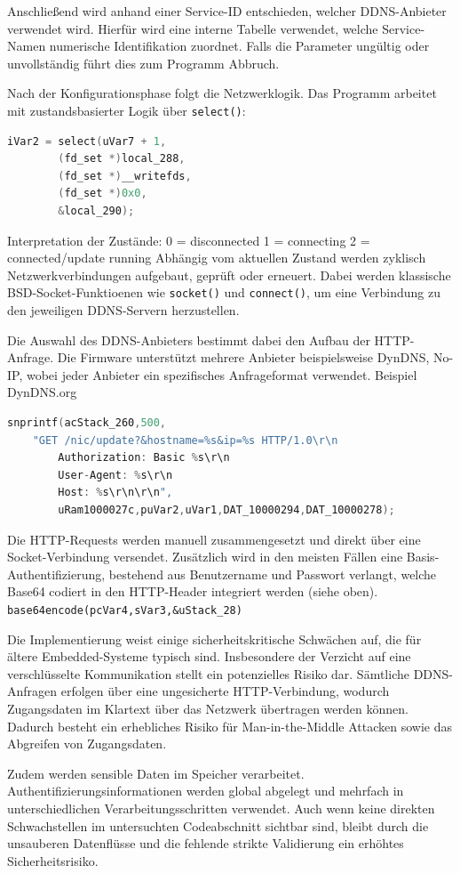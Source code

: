 	Anschließend wird anhand einer Service-ID entschieden, welcher DDNS-Anbieter
	verwendet wird. Hierfür wird eine interne Tabelle verwendet, welche Service-Namen numerische Identifikation zuordnet.
	Falls die Parameter ungültig oder unvollständig führt dies zum Programm Abbruch.

	Nach der Konfigurationsphase folgt die Netzwerklogik.
	Das Programm arbeitet mit zustandsbasierter Logik über \texttt{select()}:
\begin{lstlisting}[language=c]
iVar2 = select(uVar7 + 1,
		(fd_set *)local_288,
		(fd_set *)__writefds,
		(fd_set *)0x0,
		&local_290);
\end{lstlisting}
	Interpretation der Zustände:
	0 = disconnected
	1 = connecting
	2 = connected/update running
	Abhängig vom aktuellen Zustand werden zyklisch Netzwerkverbindungen aufgebaut, geprüft oder erneuert. 
	Dabei werden klassische BSD-Socket-Funktioenen wie \texttt{socket()} und \texttt{connect()},
	um eine Verbindung zu den jeweiligen DDNS-Servern herzustellen.
	
	Die Auswahl des DDNS-Anbieters bestimmt dabei den Aufbau der HTTP-Anfrage. 
	Die Firmware unterstützt mehrere Anbieter beispielsweise DynDNS, No-IP, wobei jeder Anbieter ein spezifisches Anfrageformat verwendet. 
	Beispiel DynDNS.org
\begin{lstlisting}[language=c]
snprintf(acStack_260,500,
	"GET /nic/update?&hostname=%s&ip=%s HTTP/1.0\r\n
		Authorization: Basic %s\r\n
		User-Agent: %s\r\n
		Host: %s\r\n\r\n",
		uRam1000027c,puVar2,uVar1,DAT_10000294,DAT_10000278);
\end{lstlisting}
	Die HTTP-Requests werden manuell zusammengesetzt und direkt über eine Socket-Verbindung versendet.
	Zusätzlich wird in den meisten Fällen eine Basis-Authentifizierung, bestehend aus Benutzername und Passwort
	verlangt, welche Base64 codiert in den HTTP-Header integriert werden (siehe oben).
	\texttt{base64encode(pcVar4,sVar3,&uStack\_28)}

	Die Implementierung weist einige sicherheitskritische Schwächen auf, die für ältere Embedded-Systeme typisch sind.
	Insbesondere der Verzicht auf eine verschlüsselte Kommunikation stellt ein potenzielles Risiko dar. 
	Sämtliche DDNS-Anfragen erfolgen über eine ungesicherte HTTP-Verbindung, wodurch Zugangsdaten im Klartext über das Netzwerk übertragen werden können.
	Dadurch besteht ein erhebliches Risiko für Man-in-the-Middle Attacken sowie das Abgreifen von Zugangsdaten.

	Zudem werden sensible Daten im Speicher verarbeitet. Authentifizierungsinformationen werden global abgelegt und mehrfach
	in unterschiedlichen Verarbeitungsschritten verwendet. Auch wenn keine direkten Schwachstellen im 
	untersuchten Codeabschnitt sichtbar sind, bleibt durch die unsauberen Datenflüsse und die 
	fehlende strikte Validierung ein erhöhtes Sicherheitsrisiko. \cite{thomas2021b}


